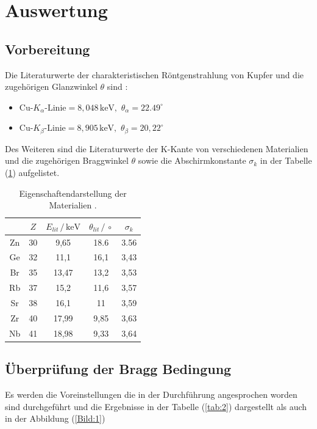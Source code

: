 \section{Auswertung}
\subsection{Vorbereitung}
Die Literaturwerte der charakteristischen Röntgenstrahlung von Kupfer und die zugehörigen
Glanzwinkel $\theta$ sind \cite{2}:
\begin{itemize}
  \item $\text{Cu-}K_\alpha \text{-Linie} = 8,048 \,\text{keV} , \, \, \theta_\alpha = 22.49^\circ$
  \item $\text{Cu-}K_\beta \text{-Linie} = 8,905 \,\text{keV} , \, \, \theta_\beta = 20,22^\circ$

\end{itemize}

Des Weiteren sind die Literaturwerte der K-Kante von verschiedenen Materialien und die zugehörigen
Braggwinkel $\theta$ sowie die Abschirmkonstante $\sigma_k$ in der Tabelle (\ref{tab:1}) aufgelistet.
\begin{table}
  \centering
  \caption{Eigenschaftendarstellung der Materialien \cite{3}.}
  \label{tab:1}
  \begin{tabular}{c c c c c}
    \toprule
     & $Z$ & $E_{lit}\,/ \, \text{keV}$ &$\theta_{lit}\,/\,\circ$ & $\sigma_k$ \\
    \midrule
    Zn & 30 & 9,65  &  18.6 & 3.56 \\
    Ge & 32 & 11,1  &  16,1 & 3,43 \\
    Br & 35 & 13,47 &  13,2 & 3,53 \\
    Rb & 37 & 15,2  &  11,6 & 3,57 \\
    Sr & 38 & 16,1  &  11   & 3,59 \\
    Zr & 40 & 17,99 &  9,85 & 3,63 \\
    Nb & 41 & 18,98 &  9,33 & 3,64 \\
    \bottomrule
  \end{tabular}
\end{table}

\subsection{Überprüfung der Bragg Bedingung}
Es werden die Voreinstellungen die in der Durchführung angesprochen worden sind
durchgeführt und die Ergebnisse in der Tabelle (\ref{tab:2})
dargestellt als auch in der Abbildung (\ref{Bild:1})

